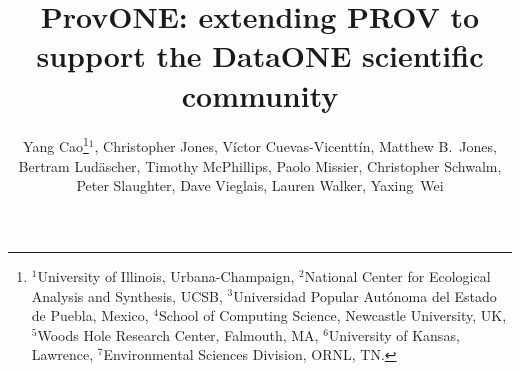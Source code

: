 \documentclass[a4paper]{llncs}
\begin{document}
\mainmatter  %

\title{ProvONE: extending PROV to support the DataONE scientific community}


\author{{Yang Cao\thanks{
$^1$University of Illinois, Urbana-Champaign, 
$^2$National Center for Ecological Analysis and Synthesis, UCSB,
$^3$Universidad Popular Aut\'onoma del Estado de Puebla, Mexico,
$^4$School of Computing Science, Newcastle  University, UK,
$^5$Woods Hole Research Center, Falmouth, MA,
$^6$University of Kansas, Lawrence,
$^7$Environmental Sciences Division, ORNL, TN.}$^1$,
Christopher Jones,  V\'ictor Cuevas-Vicentt\'in, Matthew B.\ Jones,  Bertram Lud\"ascher,  Timothy McPhillips,  Paolo Missier,   Christopher Schwalm,  Peter Slaughter,  Dave Vieglais,  Lauren Walker, Yaxing~Wei }}

\institute{\relax}



%
%

\maketitle
\end{document}
